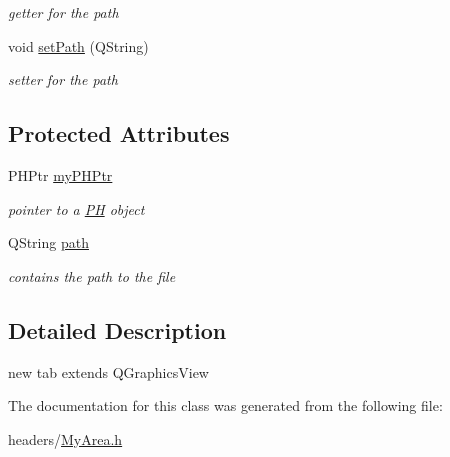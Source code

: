 \begin{DoxyCompactItemize}
\begin{DoxyCompactList}\small\item\em getter for the path \end{DoxyCompactList}\item 
\hypertarget{class_my_area_ab1f574dcb5318131128deb076743f01a}{void \hyperlink{class_my_area_ab1f574dcb5318131128deb076743f01a}{set\-Path} (\-Q\-String)}\label{class_my_area_ab1f574dcb5318131128deb076743f01a}

\begin{DoxyCompactList}\small\item\em setter for the path \end{DoxyCompactList}\end{DoxyCompactItemize}
\subsection*{\-Protected \-Attributes}
\begin{DoxyCompactItemize}
\item 
\hypertarget{class_my_area_a59beb02fefc60d81c287cbc43e6de640}{\-P\-H\-Ptr \hyperlink{class_my_area_a59beb02fefc60d81c287cbc43e6de640}{my\-P\-H\-Ptr}}\label{class_my_area_a59beb02fefc60d81c287cbc43e6de640}

\begin{DoxyCompactList}\small\item\em pointer to a \hyperlink{class_p_h}{\-P\-H} object \end{DoxyCompactList}\item 
\hypertarget{class_my_area_a70561a408470de740f580da6717871bf}{\-Q\-String \hyperlink{class_my_area_a70561a408470de740f580da6717871bf}{path}}\label{class_my_area_a70561a408470de740f580da6717871bf}

\begin{DoxyCompactList}\small\item\em contains the path to the file \end{DoxyCompactList}\end{DoxyCompactItemize}


\subsection{\-Detailed \-Description}
new tab extends \-Q\-Graphics\-View 

\-The documentation for this class was generated from the following file\-:\begin{DoxyCompactItemize}
\item 
headers/\hyperlink{_my_area_8h}{\-My\-Area.\-h}\end{DoxyCompactItemize}
